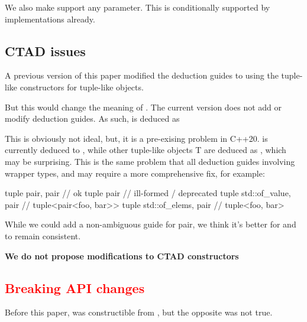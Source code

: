 \documentclass{wg21}
\begin{document}
We also make  support any  parameter.
This is conditionally supported by implementations already.

%

\subsection{CTAD issues}

A previous version of this paper modified the deduction guides to using the tuple-like constructors for tuple-like objects.

But this would change the meaning of .
The current version does not add or modify deduction guides.
As such,  is deduced as 

This is obviously not ideal, but, it is a pre-exising problem in C++20.  is currently deduced to ,
while other tuple-like objects T are deduced as , which may be surprising.
This is the same problem that all deduction guides involving wrapper types, and may require a more comprehensive fix, for example:

\begin{colorblock}
tuple {pair, pair } // ok
tuple {pair} // ill-formed / deprecated
tuple {std::of_value, pair }  // tuple<pair<foo, bar>>
tuple {std::of_elems, pair }  // tuple<foo, bar>
\end{colorblock}

While we could add a non-ambiguous guide for pair, we think it's better for  and  to remain consistent.

\textbf{We do not propose modifications to CTAD constructors}


\subsection{\textcolor{Red}{Breaking API changes}}

Before this paper,  was constructible from ,
but the opposite was not true.
\end{document}
